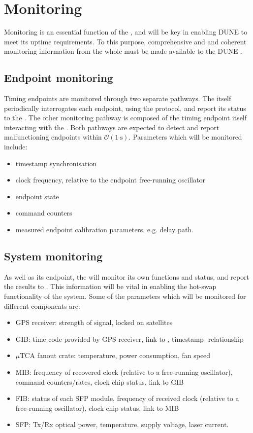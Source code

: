 \documentclass{dune}
\begin{document}
\section{Monitoring}
Monitoring is an essential function of the , and will be key in enabling DUNE to meet its uptime requirements. To this purpose, comprehensive and and coherent monitoring information from the whole  must be made available to the DUNE .

\subsection{Endpoint monitoring}
Timing endpoints are monitored through two separate pathways. The  itself periodically interrogates each endpoint, using the  protocol, and report its status to the . The other monitoring pathway is composed of the timing endpoint itself interacting with the . Both pathways are expected to detect and report malfunctioning endpoints within $\mathcal{O}(\SI{1}{\s})$. Parameters which will be monitored include:

\begin{itemize}
  \item timestamp synchronisation
  \item clock frequency, relative to the endpoint free-running oscillator
  \item endpoint state
  \item command counters
  \item measured endpoint calibration parameters, e.g. delay path.
\end{itemize}

\subsection{System monitoring}
As well as its endpoint, the  will monitor its own functions and status, and report the results to . This information will be vital in enabling the hot-swap functionality of the system. Some of the parameters which will be monitored for different  components are:

\begin{itemize}
    \item GPS receiver: strength of signal, locked on satellites 
    \item GIB: time code provided by GPS receiver, link to ,  timestamp- relationship
    \item $\mu$TCA fanout crate: temperature, power consumption, fan speed
    \item MIB: frequency of recovered clock (relative to a free-running oscillator), command counters/rates, clock chip status, link to GIB
    \item FIB: status of each SFP module, frequency of received clock (relative to a free-running oscillator), clock chip status, link to MIB
    \item SFP: Tx/Rx optical power, temperature, supply voltage, laser current.  
\end{itemize}
\end{document}
